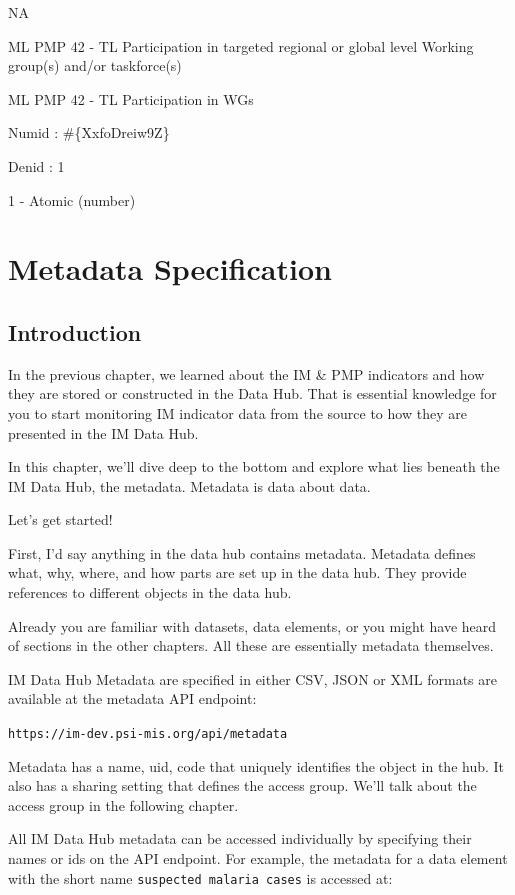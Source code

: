 \documentclass[]{book}
\begin{document}
NA

ML PMP 42 - TL Participation in targeted regional or global level Working group(s) and/or taskforce(s)

ML PMP 42 - TL Participation in WGs

Numid : \#\{XxfoDreiw9Z\}

Denid : 1

1 - Atomic (number)

\hypertarget{meta}{%
\chapter{Metadata Specification}\label{meta}}

\hypertarget{introduction-2}{%
\section{Introduction}\label{introduction-2}}

In the previous chapter, we learned about the IM \& PMP indicators and how they are stored or constructed in the Data Hub. That is essential knowledge for you to start monitoring IM indicator data from the source to how they are presented in the IM Data Hub.

In this chapter, we'll dive deep to the bottom and explore what lies beneath the IM Data Hub, the metadata. Metadata is data about data.

Let's get started!

First, I'd say anything in the data hub contains metadata. Metadata defines what, why, where, and how parts are set up in the data hub. They provide references to different objects in the data hub.

Already you are familiar with datasets, data elements, or you might have heard of sections in the other chapters. All these are essentially metadata themselves.

IM Data Hub Metadata are specified in either CSV, JSON or XML formats are available at the metadata API endpoint:

\texttt{https://im-dev.psi-mis.org/api/metadata}

Metadata has a name, uid, code that uniquely identifies the object in the hub. It also has a sharing setting that defines the access group. We'll talk about the access group in the following chapter.

All IM Data Hub metadata can be accessed individually by specifying their names or ids on the API endpoint. For example, the metadata for a data element with the short name \texttt{suspected\ malaria\ cases} is accessed at:
\end{document}
